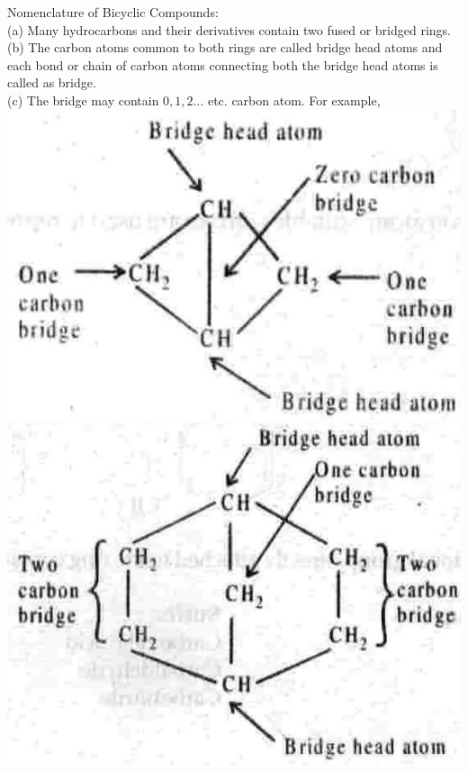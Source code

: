 \documentclass[10pt]{article}
\begin{document}
Nomenclature of Bicyclic Compounds:\\
(a) Many hydrocarbons and their derivatives contain two fused or bridged rings.\\
(b) The carbon atoms common to both rings are called bridge head atoms and each bond or chain of carbon atoms connecting both the bridge head atoms is called as bridge.\\
(c) The bridge may contain $0,1,2 \ldots$ etc. carbon atom. For example,\\
\includegraphics[max width=\textwidth, center]{2025_01_28_8470952b98110cec3aabg-034}\\
\includegraphics[max width=\textwidth, center]{2025_01_28_8470952b98110cec3aabg-034(1)}
\end{document}
